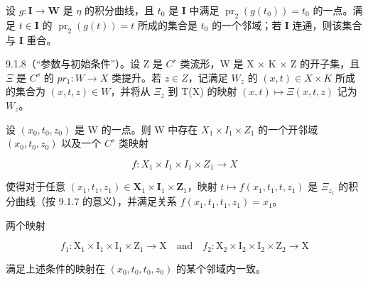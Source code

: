 设 \(g: \mathbf{I} \to \mathbf{W}\) 是 \(\eta\) 的积分曲线，且 \(t_0\) 是 \(\mathbf{I}\) 中满足 \(\operatorname{pr}_2(g(t_0)) = t_0\) 的一点。满足 \(t \in \mathbf{I}\) 的 \(\operatorname{pr}_2(g(t)) = t\) 所成的集合是 \(t_0\) 的一个邻域；若 \(\mathbf{I}\) 连通，则该集合与 \(\mathbf{I}\) 重合。

9.1.8（“参数与初始条件”）。设 Z 是 \(C^{r}\) 类流形，W 是 X × K × Z 的开子集，且 \(\Xi\) 是 \(C^{s}\) 的 \(pr_{1}: W \to X\) 类提升。若 \(z \in Z\)，记满足 \(W_{z}\) 的 \((x, t) \in X \times K\) 所成的集合为 \((x, t, z) \in W\)，并将从 \(\Xi_{z}\) 到 T(X) 的映射 \((x, t) \mapsto \Xi(x, t, z)\) 记为 \(W_{z}\)。

设 \((x_0, t_0, z_0)\) 是 W 的一点。则 W 中存在 \(X_1 \times I_1 \times Z_1\) 的一个开邻域 \((x_0, t_0, z_0)\) 以及一个 \(C^s\) 类映射

\[
f \colon X _ {1} \times I _ {1} \times I _ {1} \times Z _ {1} \rightarrow X
\]

使得对于任意 \((x_{1}, t_{1}, z_{1}) \in \mathbf{X}_{1} \times \mathbf{I}_{1} \times \mathbf{Z}_{1}\)，映射 \(t \mapsto f(x_{1}, t_{1}, t, z_{1})\) 是 \(\Xi_{z_{1}}\) 的积分曲线（按 9.1.7 的意义），并满足关系 \(f(x_{1}, t_{1}, t_{1}, z_{1}) = x_{1}\)。

两个映射

\[
f _ {1}: \mathrm{X} _ {1} \times \mathrm{I} _ {1} \times \mathrm{I} _ {1} \times \mathrm{Z} _ {1} \rightarrow \mathrm{X} \quad \text {and} \quad f _ {2}: \mathrm{X} _ {2} \times \mathrm{I} _ {2} \times \mathrm{I} _ {2} \times \mathrm{Z} _ {2} \rightarrow \mathrm{X}
\]

满足上述条件的映射在 \((x_{0}, t_{0}, t_{0}, z_{0})\) 的某个邻域内一致。

